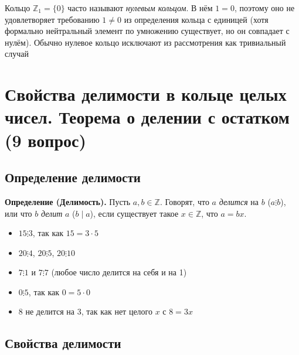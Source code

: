 \documentclass[a4paper,12pt]{article}
\theoremstyle{definition}
\theoremstyle{plain}
\theoremstyle{remark}
\begin{document}
	\begin{tcolorbox}[colback=yellow!5, colframe=orange!60!black, title=Важное замечание о $\mathbb{Z}_1$]
		Кольцо $\mathbb{Z}_1 = \{0\}$ часто называют \textit{нулевым кольцом}. В нём $1 = 0$, поэтому оно не удовлетворяет требованию $1 \neq 0$ из определения кольца с единицей (хотя формально нейтральный элемент по умножению существует, но он совпадает с нулём). Обычно нулевое кольцо исключают из рассмотрения как тривиальный случай
	\end{tcolorbox}
	
	
	
	
	
	\newpage
	\section{Свойства делимости в кольце целых чисел. Теорема о делении с остатком (9 вопрос)}
	
	\subsection{Определение делимости}
	
	\noindent \textbf{Определение (Делимость).}
	Пусть $a, b \in \mathbb{Z}$. Говорят, что $a$ \textit{делится} на $b$ ($a \vdots b$), или что $b$ \textit{делит} $a$ ($b \mid a$), если существует такое $x \in \mathbb{Z}$, что $a = bx$.
	
	\begin{tcolorbox}[colback=blue!5, colframe=blue!40!black, title=Примеры]
		\begin{itemize}
			\item $15 \vdots 3$, так как $15 = 3 \cdot 5$
			\item $20 \vdots 4$, $20 \vdots 5$, $20 \vdots 10$
			\item $7 \vdots 1$ и $7 \vdots 7$ (любое число делится на себя и на 1)
			\item $0 \vdots 5$, так как $0 = 5 \cdot 0$
			\item $8$ не делится на $3$, так как нет целого $x$ с $8 = 3x$
		\end{itemize}
	\end{tcolorbox}
	
	\subsection{Свойства делимости}
	
\end{document}
